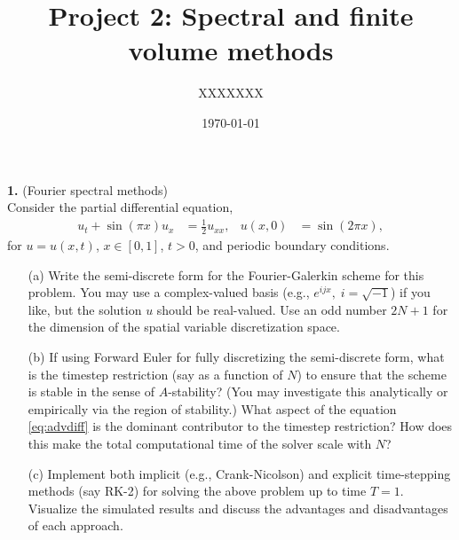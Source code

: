 \documentclass[11pt]{amsart}
\title{Project 2: Spectral and finite volume methods}
\author{XXXXXXX}
\date{\today}
\begin{document}
\maketitle

\textbf{1.} (Fourier spectral methods)\\
Consider the partial differential equation,
\begin{align}\label{eq:advdiff}
  u_t + \sin (\pi x) u_x &= \frac{1}{2} u_{x x}, & u(x,0) &= \sin (2 \pi x), %
\end{align}
for $u = u(x,t)$, $x \in [0,1]$, $t > 0$, and periodic boundary conditions.
  \begin{itemize}
     \item[(a)] Write the semi-discrete form for the Fourier-Galerkin scheme for this problem. You may use a complex-valued basis (e.g., $e^{i j x},\; i = \sqrt{-1}$) if you like, but the solution $u$ should be real-valued. Use an odd number $2 N + 1$ for the dimension of the spatial variable discretization space.
    \item[(b)] If using Forward Euler for fully discretizing the semi-discrete form, what is the timestep restriction (say as a function of $N$) to ensure that the scheme is stable in the sense of $A$-stability? (You may investigate this analytically or empirically via the region of stability.) What aspect of the equation \eqref{eq:advdiff} is the dominant contributor to the timestep restriction?  How does this make the total computational time of the solver scale with $N$?
    \item[(c)] Implement both implicit (e.g., Crank-Nicolson) and explicit time-stepping methods (say RK-2) for solving the above problem up to time $T = 1$. Visualize the simulated results and discuss the advantages and disadvantages of each approach.
  \end{itemize}
\end{document}

